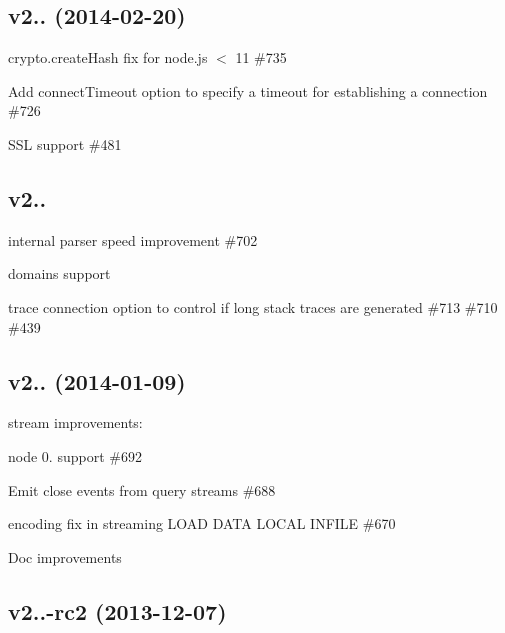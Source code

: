 \subsection*{v2.. (2014-\/02-\/20)}


\begin{DoxyItemize}
\item crypto.\+create\+Hash fix for node.\+js $<$ 11 \#735
\item Add {\ttfamily connect\+Timeout} option to specify a timeout for establishing a connection \#726
\item S\+S\+L support \#481
\end{DoxyItemize}

\subsection*{v2..}


\begin{DoxyItemize}
\item internal parser speed improvement \#702
\item domains support
\item \textquotesingle{}trace\textquotesingle{} connection option to control if long stack traces are generated \#713 \#710 \#439
\end{DoxyItemize}

\subsection*{v2.. (2014-\/01-\/09)}


\begin{DoxyItemize}
\item stream improvements\+:
\begin{DoxyItemize}
\item node 0. support \#692
\item Emit \textquotesingle{}close\textquotesingle{} events from query streams \#688
\end{DoxyItemize}
\item encoding fix in streaming L\+O\+A\+D D\+A\+T\+A L\+O\+C\+A\+L I\+N\+F\+I\+L\+E \#670
\item Doc improvements
\end{DoxyItemize}

\subsection*{v2..-\/rc2 (2013-\/12-\/07)}


